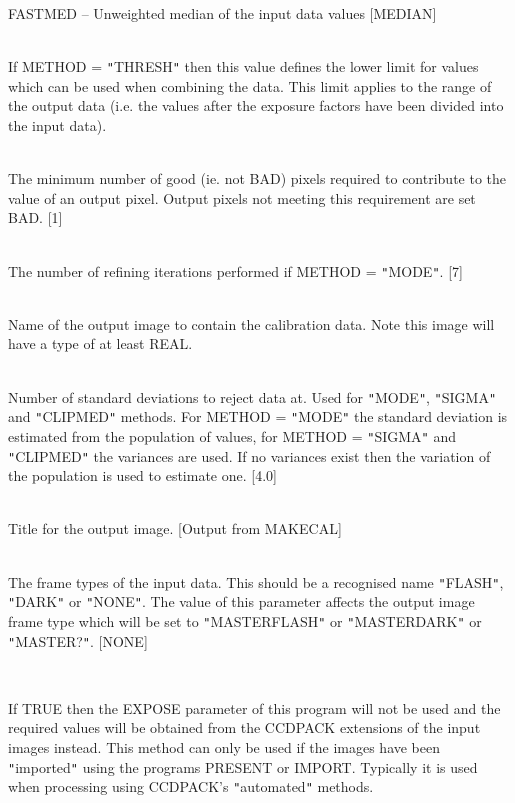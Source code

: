 \documentclass[twoside,11pt]{article}
\newcommand{\htmlref}[2]{#1}
\renewcommand{\_}{\texttt{\symbol{95}}}
\newcommand{\qt}[1]{{\tt "}#1{\tt "}}
\newcommand{\xroutine}[1]{\htmlref{{\sc #1}}{#1}}
\newcommand{\sstsubsection}[1]{ \item[{#1}] \mbox{} \\}
\newcommand{\sstitem}{\item}
\newcommand{\sstsubsection}[1]{\item[{#1}]}
\newcommand{\sstitem}{\item}
\begin{document}
{{{{            \sstitem
               FASTMED   -- Unweighted median of the input data values
            [MEDIAN]
         }
      }
      \sstsubsection{
         MIN = \_REAL (Read)
      } {
         If METHOD = \qt{THRESH} then this value defines the lower limit
         for values which can be used when combining the data. This
         limit applies to the range of the output data (i.e. the values
         after the exposure factors have been divided into the input
         data).
      }
      \sstsubsection{
         MINPIX = \_INTEGER (Read)
      } {
         The minimum number of good (ie. not BAD) pixels required
         to contribute to the value of an output pixel. Output pixels
         not meeting this requirement are set BAD.
         [1]
      }
      \sstsubsection{
         NITER = \_INTEGER (Read)
      } {
         The number of refining iterations performed if METHOD = \qt{MODE}.
         [7]
      }
      \sstsubsection{
         OUT = LITERAL (Write)
      } {
         Name of the output image to contain the calibration data.
         Note this image will have a type of at least \_REAL.
      }
      \sstsubsection{
         SIGMAS = \_REAL (Read)
      } {
         Number of standard deviations to reject data at. Used for
         \qt{MODE}, \qt{SIGMA} and \qt{CLIPMED} methods. For METHOD =
         \qt{MODE} the standard deviation is estimated from the
         population of values, for METHOD = \qt{SIGMA} and
         \qt{CLIPMED} the variances
         are used. If no variances exist then the variation of the
         population is used to estimate one.
         [4.0]
      }
      \sstsubsection{
         TITLE = LITERAL (Read)
      } {
         Title for the output image.
         [Output from MAKECAL]
      }
      \sstsubsection{
         TYPE = LITERAL (Read)
      } {
         The frame types of the input data. This should be a recognised
         name \qt{FLASH}, \qt{DARK} or \qt{NONE}. The value of this parameter
         affects the output image frame type which will be set to
         \qt{MASTER\_FLASH} or \qt{MASTER\_DARK} or \qt{MASTER\_?}.
         [NONE]
      }
      \sstsubsection{
         USEEXT = \_LOGICAL (Read)
      } {
         If TRUE then the EXPOSE parameter of this program will not
         be used and the required values will be obtained from the
         CCDPACK extensions of the input images instead. This method can
         only be used if the images have been \qt{imported} using the
         programs \xroutine{PRESENT} or \xroutine{IMPORT}. Typically it is used when
         processing using CCDPACK's \qt{automated} methods.

}}}
\end{document}

